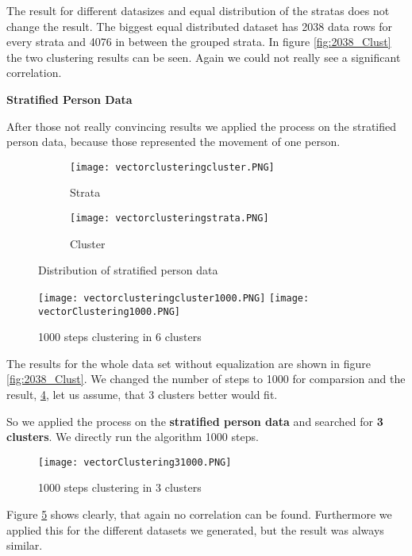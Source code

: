 The result for different datasizes and equal distribution of the stratas does not change the result. The biggest equal distributed dataset has 2038 data rows for every strata and 4076 in between the grouped strata. In figure \ref{fig:2038_Clust} the two clustering results can be seen. Again we could not really see a significant correlation.

\textbf{Stratified Person Data}

After those not really convincing results we applied the process on the stratified person data, because those represented the movement of one person.

\begin{figure}[h]
\centering
\begin{subfigure}{.5\textwidth}
  \centering
  \texttt{[image: vectorclusteringcluster.PNG]}
  \caption{Strata}
  \label{fig:VecSt}
\end{subfigure}%
\begin{subfigure}{.5\textwidth}
  \centering
  \texttt{[image: vectorclusteringstrata.PNG]}
  \caption{Cluster}
  \label{fig:VecCl}
\end{subfigure}
\caption{Distribution of stratified person data}
\label{fig:VecDist}
\end{figure}

\begin{figure}[!htbp]
\centering
\texttt{[image: vectorclusteringcluster1000.PNG]}
\texttt{[image: vectorClustering1000.PNG]}
\caption{1000 steps clustering in 6 clusters}
\label{fig:1000vect}
\end{figure}

The results for the whole data set without equalization are shown in figure \ref{fig:2038_Clust}. We changed the number of steps to 1000 for comparsion and the result, \ref{fig:1000vect}, let us assume, that 3 clusters better would fit. 


So we applied the process on the \textbf{stratified person data} and searched for \textbf{3 clusters}. We directly run the algorithm 1000 steps.

\begin{figure}[!htbp]
\centering
\texttt{[image: vectorClustering31000.PNG]}
\caption{1000 steps clustering in 3 clusters}
\label{fig:1000vect3}
\end{figure}

Figure \ref{fig:1000vect3} shows clearly, that again no correlation can be found. Furthermore we applied this for the different datasets we generated, but the result was always similar.


